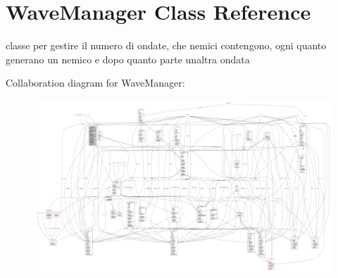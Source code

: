 \hypertarget{classmanagers_1_1_wave_manager}{}\section{Wave\+Manager Class Reference}
\label{classmanagers_1_1_wave_manager}


classe per gestire il numero di ondate, che nemici contengono, ogni quanto generano un nemico e dopo quanto parte un\textquotesingle{}altra ondata  




Collaboration diagram for Wave\+Manager\+:
\nopagebreak
\begin{figure}[H]
\begin{center}
\leavevmode
\includegraphics[width=350pt]{classmanagers_1_1_wave_manager__coll__graph}
\end{center}
\end{figure}
